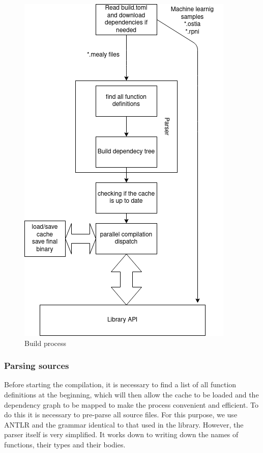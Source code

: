 \begin{figure}
\centering
\includegraphics{./diagram.png}
\caption{Build process}
\label{buildsystem:diagram}
\end{figure}

\hypertarget{parsing-sources}{%
\subsubsection{Parsing sources}\label{dependency-resolving}}

Before starting the compilation, it is necessary to find a list of all
function definitions at the beginning, which will then allow the cache
to be loaded and the dependency graph to be mapped to make the process
convenient and efficient. To do this it is necessary to pre-parse all
source files. 
For this purpose, we use ANTLR and the grammar identical to that used
in the library. However, the parser itself is very simplified. It works
down to writing down the names of functions, their types and their bodies. 

